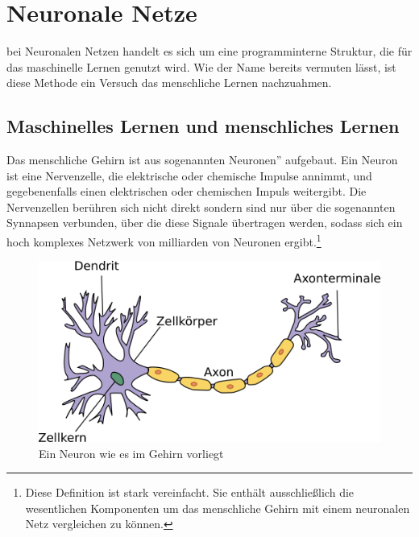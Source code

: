 \documentclass{article}
\begin{document}
\section{Neuronale Netze}\label{sec:neuronale-netze}
bei Neuronalen Netzen handelt es sich um eine programminterne Struktur, die für das maschinelle Lernen genutzt wird. Wie der Name bereits vermuten lässt, ist diese Methode ein Versuch das menschliche Lernen nachzuahmen.
\subsection{Maschinelles Lernen und menschliches Lernen}
Das menschliche Gehirn ist aus sogenannten \glqq Neuronen'' aufgebaut. Ein Neuron ist eine Nervenzelle, die elektrische oder chemische Impulse annimmt, und gegebenenfalls einen elektrischen oder chemischen Impuls weitergibt. Die Nervenzellen berühren sich nicht direkt sondern sind nur über die sogenannten Synnapsen verbunden, über die diese Signale übertragen werden, sodass sich ein hoch komplexes Netzwerk von milliarden von Neuronen ergibt.\footnote{
Diese Definition ist stark vereinfacht. Sie enthält ausschließlich die wesentlichen Komponenten um das menschliche Gehirn mit einem neuronalen Netz vergleichen zu können.}
\begin{figure}[h]
	\centering
	\includegraphics[]{../graphics/Neuron.png}
	\caption[Neuron \newline 
	Quelle: simple.wikipedia.org/wiki/File:Neuron.svg\newline
	Copyright: CC Attribution-Share Alike von Nutzer Dhp1080,\newline
 	bearbeitet]{Ein Neuron wie es im Gehirn vorliegt}
\end{figure}
\end{document}
